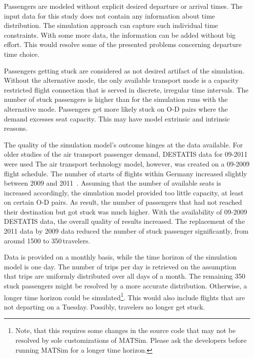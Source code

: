 Passengers are modeled without explicit desired departure or arrival times. 
The input data for this study does not contain any information about time distribution. 
The simulation approach can capture such individual time constraints.  
With some more data, the information can be added without big effort. 
This would resolve some of the presented problems concerning departure time choice. 

%
Passengers getting stuck are considered as not desired artifact of the simulation. 
Without the alternative mode, the only available transport mode is a capacity restricted flight connection that is served in discrete, irregular time intervals. 
The number of stuck passengers is higher than for the simulation runs with the alternative mode. 
Passengers get more likely stuck on O-D pairs where the demand excesses seat capacity. 
This may have model extrinsic and intrinsic reasons. 

The quality of the simulation model's outcome hinges at the data available.  
For older studies of the air transport passenger demand, DESTATIS data for 09-2011 were used
The air transport technology model, however, was created on a 09-2009 flight schedule.  
The number of starts of flights within Germany increased slightly between 2009 and 2011~\citep[][p.~23]{DLR2011Luftverkehrsbericht}. 
Assuming that the number of available seats is increased accordingly, the simulation model provided too little capacity, at least on certain O-D pairs. 
As result, the number of passengers that had not reached their destination but got stuck was much higher. 
With the availability of 09-2009 DESTATIS data, the overall quality of results increased.  
The replacement of the 2011 data by 2009 data reduced the number of stuck passenger significantly, from around 1500 to 350\,travelers. 

Data is provided on a monthly basis, while the time horizon of the simulation model is one day. 
The number of trips per day is retrieved on the assumption that trips are uniformly distributed over all days of a month.  
The remaining 350\,stuck passengers might be resolved by a more accurate distribution. 
Otherwise, a longer time horizon could be simulated\footnote{Note, that this requires some changes in the source code that may not be resolved by sole customizations of MATSim. Please ask the developers before running MATSim for a longer time horizon.}. 
This would also include flights that are not departing on a Tuesday. 
Possibly, travelers no longer get stuck. 

